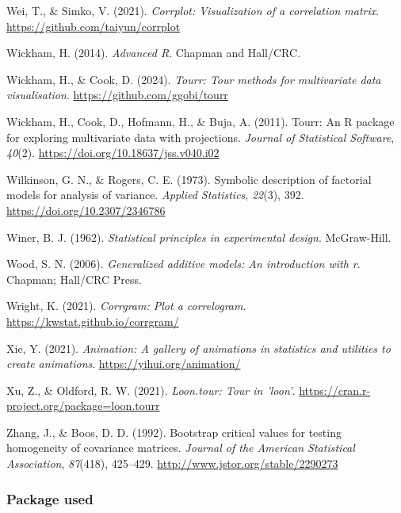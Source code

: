 \documentclass[
  letterpaper,
  10pt,
  krantz2]{krantz}
\newlength{\cslhangindent}
\newenvironment{CSLReferences}[2] %
 {\begin{list}{}{%
  \setlength{\itemindent}{0pt}
  \setlength{\leftmargin}{0pt}
  \setlength{\parsep}{0pt}
  \ifodd #1
   \setlength{\leftmargin}{\cslhangindent}
   \setlength{\itemindent}{-1\cslhangindent}
  \fi
  \setlength{\itemsep}{#2\baselineskip}}}
 {\end{list}}
\begin{document}
\begin{CSLReferences}{1}{0}
Wei, T., \& Simko, V. (2021). \emph{Corrplot: Visualization of a
correlation matrix}. \url{https://github.com/taiyun/corrplot}

Wickham, H. (2014). \emph{{Advanced R}}. {Chapman and Hall/CRC}.

Wickham, H., \& Cook, D. (2024). \emph{Tourr: Tour methods for
multivariate data visualisation}. \url{https://github.com/ggobi/tourr}

Wickham, H., Cook, D., Hofmann, H., \& Buja, A. (2011). Tourr: An {R}
package for exploring multivariate data with projections. \emph{Journal
of Statistical Software}, \emph{40}(2).
\url{https://doi.org/10.18637/jss.v040.i02}

Wilkinson, G. N., \& Rogers, C. E. (1973). Symbolic description of
factorial models for analysis of variance. \emph{Applied Statistics},
\emph{22}(3), 392. \url{https://doi.org/10.2307/2346786}

Winer, B. J. (1962). \emph{Statistical principles in experimental
design}. McGraw-Hill.

Wood, S. N. (2006). \emph{Generalized additive models: An introduction
with r}. Chapman; Hall/CRC Press.

Wright, K. (2021). \emph{Corrgram: Plot a correlogram}.
\url{https://kwstat.github.io/corrgram/}

Xie, Y. (2021). \emph{Animation: A gallery of animations in statistics
and utilities to create animations}. \url{https://yihui.org/animation/}

Xu, Z., \& Oldford, R. W. (2021). \emph{Loon.tour: Tour in 'loon'}.
\url{https://cran.r-project.org/package=loon.tourr}

Zhang, J., \& Boos, D. D. (1992). Bootstrap critical values for testing
homogeneity of covariance matrices. \emph{Journal of the American
Statistical Association}, \emph{87}(418), 425--429.
\url{http://www.jstor.org/stable/2290273}

\end{CSLReferences}

\subsubsection*{Package used}\label{package-used}



\backmatter
\printindex
\end{document}

